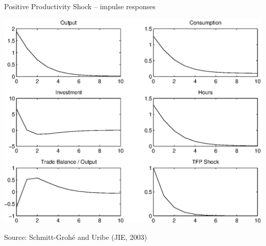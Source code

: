 \documentclass{beamer}
\newcommand{\tb}[1]{{\color{blue}{\textbf{#1}}}}
\begin{document}
%
%
%
%
%

\begin{frame}{Positive Productivity Shock -- impulse responses} 



\centering
\includegraphics[width = 0.85\linewidth]{FIGURES/soe_rbc_edeir.eps} 

{\tiny Source: Schmitt-Groh\'e and Uribe (JIE, 2003)}

\end{frame}
\end{document}
